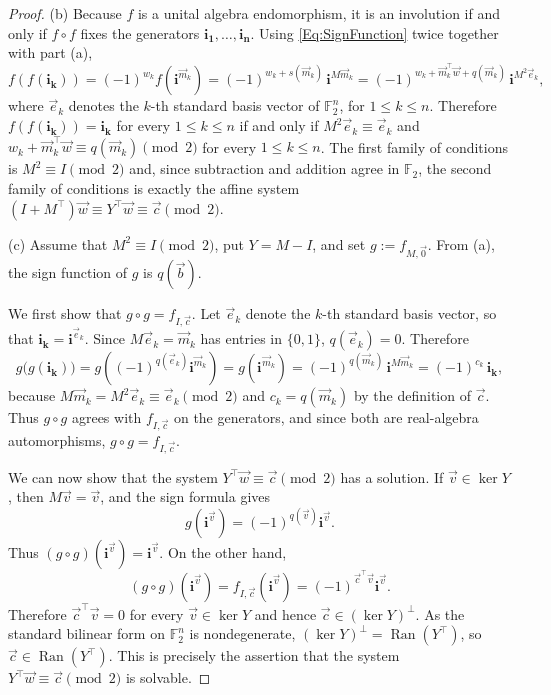 \documentclass[12pt]{amsart}
\theoremstyle{plain}
\theoremstyle{definition}
\numberwithin{equation}{section}
\newcommand{\im}[1]{\mathbf{ i_{#1}}}
\begin{document}
\begin{proof}
    (b) Because $f$ is a unital algebra endomorphism, it is an involution if and only if $f\circ f$ fixes the generators $\im{1}, \ldots, \im{n}$. Using \eqref{Eq:SignFunction} twice together with part (a),
    \[
    f(f(\im{k})) = (-1)^{w_k} f (\mathbf i^{\vec{m}_k}) = (-1)^{w_k + s(\vec{m}_k)}\, \mathbf i^{M \vec{m}_k} = (-1)^{w_k + \vec{m}_k^{\top} \vec w + q(\vec{m}_k)}\, \mathbf i^{M^2 \vec e_k}, 
    \]
    where $\vec e_k$ denotes the $k$-th standard basis vector of $\mathbb F_2^n$, for $1 \leq k \leq n$. Therefore $f(f(\im{k})) = \im{k}$ for every $1 \leq k \leq n$ if and only if $M^2 \vec e_k \equiv \vec e_k$ and $w_k + \vec{m}_k^{\top}\vec w \equiv q (\vec{m}_k) \pmod 2$ for every $1 \leq k \leq n$. The first family of conditions is $M^2 \equiv I \pmod 2$ and, since subtraction and addition agree in $\mathbb F_2$, the second family of conditions is exactly the affine system $(I + M^{\top}) \vec w \equiv Y^{\top} \vec w \equiv \vec c \pmod 2$.

    (c) Assume that $M^2\equiv I\pmod2$, put $Y=M-I$, and set
$g:=f_{M,\vec0}$. From (a), the sign function of $g$ is $q (\vec{b})$. 

We first show that $g \circ g = f_{I, \vec{c}}$. Let $\vec e_k$ denote the $k$-th standard basis
vector, so that $\im{k} = \mathbf i^{\vec e_k}$. Since $M\vec e_k = \vec m_k$ has entries
in $\{0,1\}$, $q(\vec e_k) = 0$. Therefore
\[
g\big(g(\im{k})\big)
= g( (-1)^{q (\vec{e}_k )} \mathbf i^{\vec m_k}) = g (\im{}^{\vec{m}_k}) 
= (-1)^{q(\vec m_k)}\, \mathbf i^{M \vec m_k}
= (-1)^{c_k}\, \im{k},
\]
because $M\vec m_k = M^2 \vec e_k \equiv \vec e_k \pmod 2$ and $c_k = q(\vec m_k)$ by the
definition of $\vec c$. Thus $g \circ g$ agrees with $f_{I, \vec c}$ on the generators, and
since both are real-algebra automorphisms, $g \circ g = f_{I, \vec c}$.  

We can now show that the system $Y^{\top} \vec{w} \equiv \vec{c} \pmod 2$ has a solution. If $\vec v\in\ker Y$, then
$M\vec v=\vec v$, and the sign formula gives
\[
g(\mathbf i^{\vec v})
=(-1)^{q(\vec v)}\mathbf i^{\vec v}.
\]
Thus $(g\circ g)(\mathbf i^{\vec v})=\mathbf i^{\vec v}$. On the
other hand,
\[
(g\circ g)(\mathbf i^{\vec v})
=f_{I,\vec c}(\mathbf i^{\vec v})
=(-1)^{\vec c^\top\vec v}\mathbf i^{\vec v}.
\]
Therefore $\vec c^\top\vec v=0$ for every $\vec v\in\ker Y$ and hence $\vec{c} \in (\ker Y )^{\perp}$. As the standard bilinear form on $\mathbb F_2^n$ is
nondegenerate, $(\ker Y)^{\perp} = \operatorname{Ran}(Y^{\top})$, so $\vec c \in
\operatorname{Ran}(Y^{\top})$. This is precisely the assertion that the system $Y^{\top}
\vec w \equiv \vec c \pmod 2$ is solvable.


\end{proof}
\end{document}
